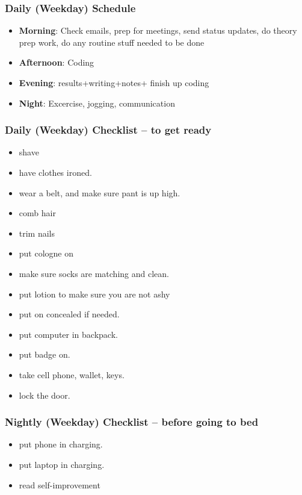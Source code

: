 \begin{frame} 
\frametitle{Daily (Weekday) Schedule}
\begin{itemize} 
\item \textbf{Morning}: Check emails, prep for meetings, send status updates, 
do theory prep work, do any routine stuff needed to be done 
\item \textbf{Afternoon}: Coding 
\item \textbf{Evening}: results+writing+notes+  finish up coding  
\item \textbf{Night}: Excercise, jogging, communication 
\end{itemize} 
\end{frame} 

\begin{frame} 
\frametitle{Daily (Weekday) Checklist -- to get ready} 
\begin{itemize} 
\item \tiny shave \\
\item \tiny have clothes ironed. \\
\item \tiny wear a belt, and make sure pant is up high. \\
\item \tiny comb hair \\
\item \tiny trim nails \\
\item \tiny put cologne on \\
\item \tiny make sure socks are matching and clean. \\
\item \tiny put lotion to make sure you are not ashy \\ 
\item \tiny  put on concealed if needed. \\
\item \tiny put computer in backpack.
\item \tiny put badge on. 
\item \tiny take cell phone, wallet, keys.
\item \tiny lock the door. \\
\end{itemize} 
\end{frame}

\begin{frame} 
\frametitle{Nightly (Weekday) Checklist -- before going to bed} 
\begin{itemize} 
\item \small put phone in charging.
\item \small put laptop in charging. 
\item \small read self-improvement
\end{itemize} 
\end{frame}

